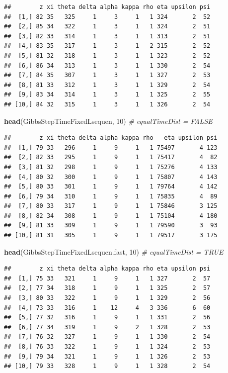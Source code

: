 \documentclass[
]{article}
\newenvironment{Shaded}{\begin{snugshade}}{\end{snugshade}}
\newcommand{\CommentTok}[1]{\textcolor[rgb]{0.56,0.35,0.01}{\textit{#1}}}
\newcommand{\DecValTok}[1]{\textcolor[rgb]{0.00,0.00,0.81}{#1}}
\newcommand{\FunctionTok}[1]{\textcolor[rgb]{0.13,0.29,0.53}{\textbf{#1}}}
\newcommand{\NormalTok}[1]{#1}
\begin{document}
\begin{verbatim}
##        z xi theta delta alpha kappa rho eta upsilon psi
##  [1,] 82 35   325     1     3     1   1 324       2  52
##  [2,] 85 34   322     1     3     1   1 324       2  51
##  [3,] 82 33   314     1     3     1   1 313       2  51
##  [4,] 83 35   317     1     3     1   2 315       2  52
##  [5,] 81 32   318     1     3     1   1 323       2  52
##  [6,] 86 34   313     1     3     1   1 330       2  54
##  [7,] 84 35   307     1     3     1   1 327       2  53
##  [8,] 81 33   312     1     3     1   1 329       2  54
##  [9,] 83 34   314     1     3     1   1 325       2  55
## [10,] 84 32   315     1     3     1   1 326       2  54
\end{verbatim}

\begin{Shaded}
\begin{Highlighting}[]
\FunctionTok{head}\NormalTok{(GibbsStepTimeFixedLsequen, }\DecValTok{10}\NormalTok{)      }\CommentTok{\# equalTimeDist = FALSE}
\end{Highlighting}
\end{Shaded}

\begin{verbatim}
##        z xi theta delta alpha kappa rho   eta upsilon psi
##  [1,] 79 33   296     1     9     1   1 75497       4 123
##  [2,] 82 33   295     1     9     1   1 75417       4  82
##  [3,] 81 32   298     1     9     1   1 75276       4 133
##  [4,] 80 32   300     1     9     1   1 75807       4 143
##  [5,] 80 33   301     1     9     1   1 79764       4 142
##  [6,] 79 34   310     1     9     1   1 75835       4  89
##  [7,] 80 33   317     1     9     1   1 75846       3 125
##  [8,] 82 34   308     1     9     1   1 75104       4 180
##  [9,] 81 33   309     1     9     1   1 79590       3  93
## [10,] 81 31   305     1     9     1   1 79517       3 175
\end{verbatim}

\begin{Shaded}
\begin{Highlighting}[]
\FunctionTok{head}\NormalTok{(GibbsStepTimeFixedLsequen.fast, }\DecValTok{10}\NormalTok{) }\CommentTok{\# equalTimeDist = TRUE}
\end{Highlighting}
\end{Shaded}

\begin{verbatim}
##        z xi theta delta alpha kappa rho eta upsilon psi
##  [1,] 75 33   321     1     9     1   1 327       2  57
##  [2,] 77 34   318     1     9     1   1 325       2  57
##  [3,] 80 33   322     1     9     1   1 329       2  56
##  [4,] 73 33   316     1    12     4   3 336       6  60
##  [5,] 77 32   316     1     9     1   1 331       2  56
##  [6,] 77 34   319     1     9     2   1 328       2  53
##  [7,] 76 32   327     1     9     1   1 330       2  54
##  [8,] 76 33   322     1     9     1   1 324       2  53
##  [9,] 79 34   321     1     9     1   1 326       2  53
## [10,] 79 33   328     1     9     1   1 328       2  54
\end{verbatim}
\end{document}
